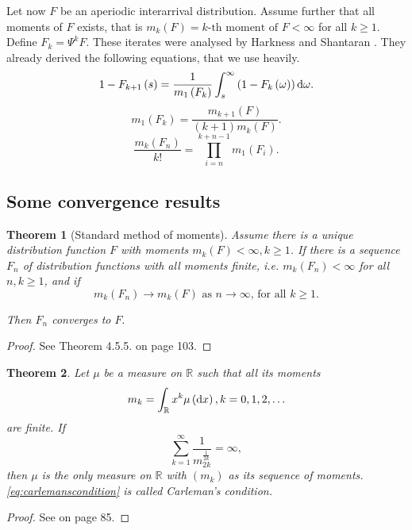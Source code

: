 \documentclass[12pt,a4paper]{scrartcl}
\newtheorem{theorem}{Theorem}[section]
\numberwithin{equation}{section}
\newcommand{\R}{\mathbb{R}} %
\begin{document}
Let now $ F $ be an aperiodic interarrival distribution. Assume further that all moments of $F$ exists, that is $m_k\left(F\right) = \text{$k$-th moment of $F$} < \infty$ for all $ k\geq 1$. Define $F_k = \Psi^k F$. These iterates were analysed by Harkness and Shantaran \cite{harkness}. They already derived the following equations, that we use heavily.
\begin{equation}
1- F_{k+1}\left(s\right) = \frac{1}{m_1\left(F_k\right)} \int_s^{\infty} \left(1-F_k\left(\omega\right) \right) \textnormal{d}\omega.
\end{equation}
\begin{equation}
m_1\left(F_k\right) = \frac{m_{k+1}\left(F\right)}{\left(k+1\right)m_k\left(F\right)}.
\end{equation}
\begin{equation}
\frac{m_k\left(F_n\right)}{k!} = \prod_{i=n}^{k+n-1} m_1\left(F_i\right).
\end{equation}

\subsection{Some convergence results}
\begin{theorem} [Standard method of moments]
Assume there is a unique distribution function $F$ with  moments $m_k\left(F\right) < \infty, k \geq 1$. If there is a sequence $F_n$ of distribution functions with all moments finite, i.e. $m_k\left(F_n\right) < \infty $ for all $ n,k \geq 1 $, and if
$$  m_k\left(F_n\right) \to m_k\left(F\right) \text{ as $n \to \infty$, for all $k\geq 1$} .$$

Then $F_n$ converges to $F.$
\end{theorem}
\begin{proof}
See \cite{chung} Theorem 4.5.5. on page 103.
\end{proof}

\begin{theorem}
Let $\mu$ be a measure on $\R$ such that all its moments
$$ m_k = \int_{\R} x^k \mu\left(\textnormal{d}x\right),  k=0,1,2,\ldots $$
are finite. If 
\begin{equation} \label{eq:carlemanscondition}
\sum_{k=1}^{\infty} \frac{1}{m_{2k}^{\frac{1}{2k}}} = \infty,
\end{equation}
then $\mu$ is the only measure on $\R$ with $\left(m_k\right)$ as its sequence of moments. \eqref{eq:carlemanscondition} is called Carleman’s condition.
\end{theorem}
\begin{proof}
See \cite{akhiezer} on page 85.
\end{proof}
\end{document}
